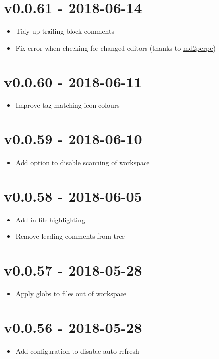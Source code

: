 \chapter{v0.0.61 - 2018-06-14}
\begin{itemize}
\item{Tidy up trailing block comments}
\item{Fix error when checking for changed editors (thanks to \href{https://github.com/md2perpe}{md2perpe})}
\end{itemize}

\chapter{v0.0.60 - 2018-06-11}
\begin{itemize}
\item{Improve tag matching icon colours}
\end{itemize}

\chapter{v0.0.59 - 2018-06-10}
\begin{itemize}
\item{Add option to disable scanning of workspace}
\end{itemize}

\chapter{v0.0.58 - 2018-06-05}
\begin{itemize}
\item{Add in file highlighting}
\item{Remove leading comments from tree}
\end{itemize}

\chapter{v0.0.57 - 2018-05-28}
\begin{itemize}
\item{Apply globs to files out of workspace}
\end{itemize}

\chapter{v0.0.56 - 2018-05-28}
\begin{itemize}
\item{Add configuration to disable auto refresh}
\end{itemize}

